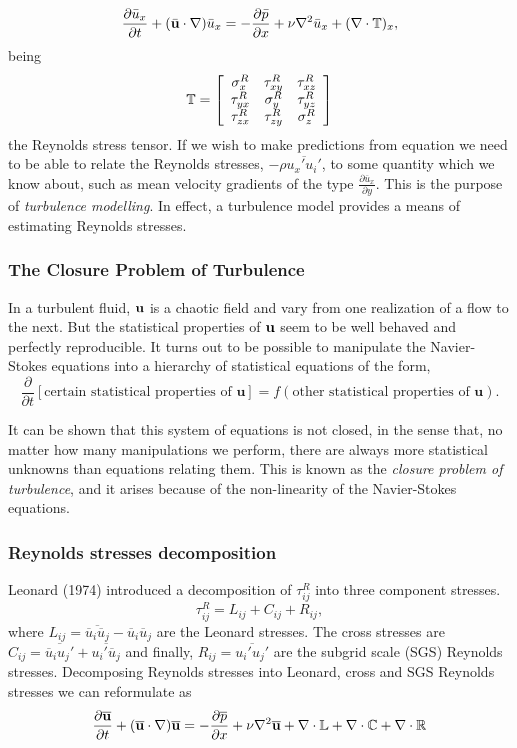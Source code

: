 \begin{equation}
\label{eq-momentum_x_reynolds}
\frac{\partial \bar{u}_x}{\partial t}+(\bar{\mathbf{u}}\cdot\nabla)\bar{u}_x=-\frac{\partial\bar{p}}{\partial x}+\nu\nabla^2\bar{u}_x+(\nabla\cdot\mathbb{T})_x,
\end{equation}
being
$$\mathbb{T}=\left[\begin{array}{ccc}
\sigma_x^R&\tau_{xy}^R&\tau_{xz}^R\\
\tau_{yx}^R&\sigma_y^R&\tau_{yz}^R\\
\tau_{zx}^R&\tau_{zy}^R&\sigma_z^R
\end{array}\right]$$
the Reynolds stress tensor. If we wish to make predictions from equation  we need to be able to relate the Reynolds stresses, $ -\rho\overline{u_x'u_i'} $, to some quantity which we know about, such as mean velocity gradients of the type $ \frac{\partial\overline{u}_x}{\partial y} $. This is the purpose of \textit{turbulence modelling}. In effect, a turbulence model provides a means of estimating Reynolds stresses.

\subsubsection{The Closure Problem of Turbulence}
In a turbulent fluid, ${\bf u}$ is a chaotic field and vary from one realization of a flow to the next. But the statistical properties of ${\bf u}$ seem to be well behaved and perfectly reproducible. It turns out to be possible to manipulate the Navier-Stokes equations into a hierarchy of statistical equations of the form, 
$$\frac{\partial}{\partial t}[\mbox{certain statistical properties of }\mathbf{u}]=f(\mbox{other statistical properties of }\mathbf{u}).$$

It can be shown that this system of equations is not closed, in the sense that, no matter how many manipulations we perform, there are always more statistical unknowns than equations relating them. This is known as the \textit{closure problem of turbulence}, and it arises because of the non-linearity of the Navier-Stokes equations.

\subsubsection{Reynolds stresses decomposition}
\label{subsubsec:reynolds_decomposition}
Leonard (1974) introduced a decomposition of $\tau_{ij}^R$ into three component stresses.
$$\tau_{ij}^R=L_{ij}+C_{ij}+R_{ij},$$
where $L_{ij}=\overline{\overline{u}_i\overline{u}_j}-\overline{u}_i\overline{u}_j$ are the Leonard stresses. The cross stresses are $C_{ij}=\overline{\overline{u}_iu_j'}+\overline{u_i'\overline{u}_j}$ and finally, $R_{ij}=\overline{u_i'u_j'}$ are the subgrid scale (SGS) Reynolds stresses. Decomposing Reynolds stresses into Leonard, cross and SGS Reynolds stresses we can reformulate  as
$$\frac{\partial \overline{{\bf u}}}{\partial t}+(\overline{{\bf u}}\cdot\nabla)\overline{{\bf u}}=-\frac{\partial\overline{p}}{\partial x}+\nu\nabla^2\overline{{\bf u}}+\nabla\cdot\mathbb{L}+\nabla\cdot\mathbb{C}+\nabla\cdot\mathbb{R}$$

